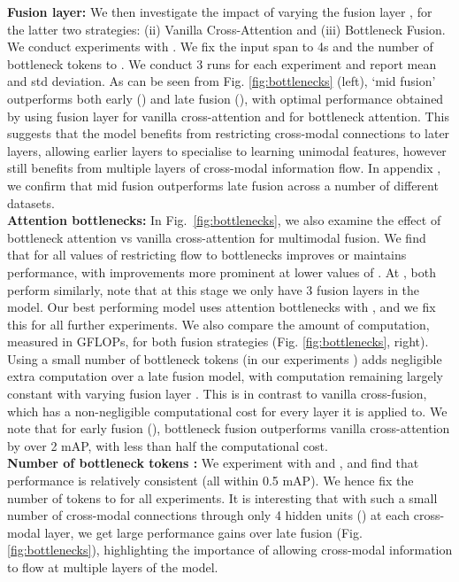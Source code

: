\noindent\textbf{Fusion layer:} We then investigate the impact of varying the fusion layer , for the latter two strategies: (ii) Vanilla Cross-Attention and (iii) Bottleneck Fusion. We conduct experiments with . We fix the input span  to 4s and the number of bottleneck tokens  to . We conduct 3 runs for each experiment and report mean and std deviation. As can be seen from Fig. \ref{fig:bottlenecks} (left), `mid fusion' outperforms both early () and late fusion (), with optimal performance obtained by using fusion layer  for vanilla cross-attention and  for bottleneck attention. This suggests that the model benefits from restricting cross-modal connections to later layers, allowing earlier layers to specialise to learning unimodal features, however still benefits from multiple layers of cross-modal information flow. In appendix
\if{} \else{\ref{sec:late_fusion_dataset_analysis}}
\fi
, we confirm that mid fusion outperforms late fusion across a number of different datasets.\\
\noindent\textbf{Attention bottlenecks:} In Fig.~\ref{fig:bottlenecks}, we also examine the effect of bottleneck attention vs vanilla cross-attention for multimodal fusion. We find that for all values of  restricting flow to bottlenecks improves or maintains performance, with improvements more prominent at lower values of . At , both perform similarly, note that at this stage we only have 3 fusion layers in the model. Our best performing model uses attention bottlenecks with , and we fix this for all further experiments. We also compare the amount of computation, measured in GFLOPs, for both fusion strategies (Fig. \ref{fig:bottlenecks}, right). Using a small number of bottleneck tokens (in our experiments ) adds negligible extra computation over a late fusion model, with computation remaining largely constant with varying fusion layer . This is in contrast to vanilla cross-fusion, which has a non-negligible computational cost for every layer it is applied to. We note that for early fusion (), bottleneck fusion outperforms vanilla cross-attention by over 2 mAP, with less than half the computational cost.  \\
\noindent\textbf{Number of bottleneck tokens :} We experiment with  and , and find that performance is relatively consistent (all within 0.5 mAP). We hence fix the number of tokens to  for all experiments. It is interesting that with such a small number of cross-modal connections through only 4 hidden units () at each cross-modal layer, we get large performance gains over late fusion (Fig. \ref{fig:bottlenecks}), highlighting the importance of allowing cross-modal information to flow at multiple layers of the model.

